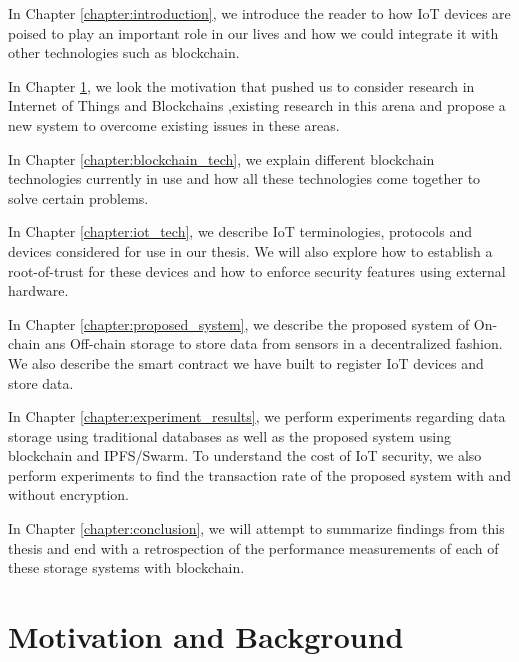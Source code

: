 \documentclass[11pt,openright]{report}
\begin{document}
In Chapter \ref{chapter:introduction}, we introduce the reader to how IoT devices are poised to play an important role in our lives and how we could integrate it with other technologies such as blockchain.\newline

\noindent In Chapter \ref{chapter:background}, we look the motivation that pushed us to consider research in Internet of Things and Blockchains ,existing research in this arena and propose a new system to overcome existing issues in these areas. \newline

\noindent In Chapter \ref{chapter:blockchain_tech}, we explain different blockchain technologies currently in use and how all these technologies come together to solve certain problems. \newline

\noindent In Chapter \ref{chapter:iot_tech}, we describe IoT terminologies, protocols and devices considered for use in our thesis. We will also explore how to establish a root-of-trust for these devices and how to enforce security features using external hardware. \newline

\noindent In Chapter \ref{chapter:proposed_system}, we describe the proposed system of On-chain ans Off-chain storage to store data from sensors in a decentralized fashion. We also describe the smart contract we have built to register IoT devices and store data.\newline

\noindent In Chapter \ref{chapter:experiment_results}, we perform experiments regarding data storage using traditional databases as well as the proposed system using blockchain and IPFS/Swarm. To understand the cost of IoT security, we also perform experiments to find the transaction rate of the proposed system with and without encryption.\newline

\noindent In Chapter \ref{chapter:conclusion}, we will attempt to summarize findings from this thesis and end with a retrospection of the performance measurements of each of these storage systems with blockchain.\newline 

\chapter{Motivation and Background} \label{chapter:background}
\end{document}
